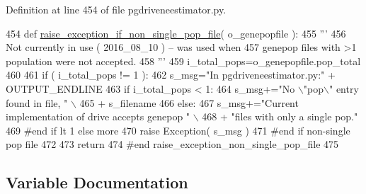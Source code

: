 Definition at line 454 of file pgdriveneestimator.\+py.


\begin{DoxyCode}
454 \textcolor{keyword}{def }\hyperlink{namespacenegui_1_1pgdriveneestimator_ac98833013f11d6aa3544b0fc60951632}{raise\_exception\_if\_non\_single\_pop\_file}( o\_genepopfile ):
455     \textcolor{stringliteral}{'''}
456 \textcolor{stringliteral}{    Not currently in use ( 2016\_08\_10 ) -- was used when}
457 \textcolor{stringliteral}{    genepop files with >1 population were not accepted.}
458 \textcolor{stringliteral}{    '''}
459     i\_total\_pops=o\_genepopfile.pop\_total
460 
461     \textcolor{keywordflow}{if} ( i\_total\_pops != 1 ):
462         s\_msg=\textcolor{stringliteral}{"In pgdriveneestimator.py:"} + OUTPUT\_ENDLINE
463         \textcolor{keywordflow}{if} i\_total\_pops < 1:
464             s\_msg+=\textcolor{stringliteral}{"No \(\backslash\)"pop\(\backslash\)" entry found in file, "} \(\backslash\)
465                     + s\_filename
466         \textcolor{keywordflow}{else}:
467             s\_msg+=\textcolor{stringliteral}{"Current implementation of drive accepts genepop "} \(\backslash\)
468                 + \textcolor{stringliteral}{"files with only a single pop."}
469         \textcolor{comment}{#end if lt 1 else more}
470         \textcolor{keywordflow}{raise} Exception( s\_msg )
471     \textcolor{comment}{#end if non-single pop file}
472 
473     \textcolor{keywordflow}{return}
474 \textcolor{comment}{#end raise\_exception\_non\_single\_pop\_file}
475 
\end{DoxyCode}


\subsection{Variable Documentation}
